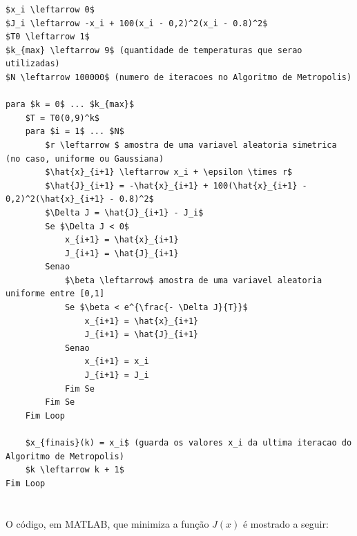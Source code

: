 \documentclass{report}
\begin{document}
\begin{lstlisting}
$x_i \leftarrow 0$
$J_i \leftarrow -x_i + 100(x_i - 0,2)^2(x_i - 0.8)^2$
$T0 \leftarrow 1$
$k_{max} \leftarrow 9$ (quantidade de temperaturas que serao utilizadas)
$N \leftarrow 100000$ (numero de iteracoes no Algoritmo de Metropolis)

para $k = 0$ ... $k_{max}$
	$T = T0(0,9)^k$
	para $i = 1$ ... $N$
		$r \leftarrow $ amostra de uma variavel aleatoria simetrica (no caso, uniforme ou Gaussiana)
		$\hat{x}_{i+1} \leftarrow x_i + \epsilon \times r$
		$\hat{J}_{i+1} = -\hat{x}_{i+1} + 100(\hat{x}_{i+1} - 0,2)^2(\hat{x}_{i+1} - 0.8)^2$
		$\Delta J = \hat{J}_{i+1} - J_i$
		Se $\Delta J < 0$
			x_{i+1} = \hat{x}_{i+1}
			J_{i+1} = \hat{J}_{i+1}
		Senao
			$\beta \leftarrow$ amostra de uma variavel aleatoria uniforme entre [0,1]
			Se $\beta < e^{\frac{- \Delta J}{T}}$
				x_{i+1} = \hat{x}_{i+1}
				J_{i+1} = \hat{J}_{i+1}
			Senao
				x_{i+1} = x_i
				J_{i+1} = J_i
			Fim Se
		Fim Se
	Fim Loop
	
	$x_{finais}(k) = x_i$ (guarda os valores x_i da ultima iteracao do Algoritmo de Metropolis)
	$k \leftarrow k + 1$
Fim Loop
		
\end{lstlisting}

\paragraph{} O código, em MATLAB, que minimiza a função $J(x)$ é mostrado a seguir:
\end{document}
